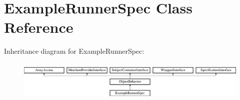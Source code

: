 \section{Example\+Runner\+Spec Class Reference}
\label{classspec_1_1_php_spec_1_1_runner_1_1_example_runner_spec}
Inheritance diagram for Example\+Runner\+Spec\+:\begin{figure}[H]
\begin{center}
\leavevmode
\includegraphics[height=1.953488cm]{classspec_1_1_php_spec_1_1_runner_1_1_example_runner_spec}
\end{center}
\end{figure}
